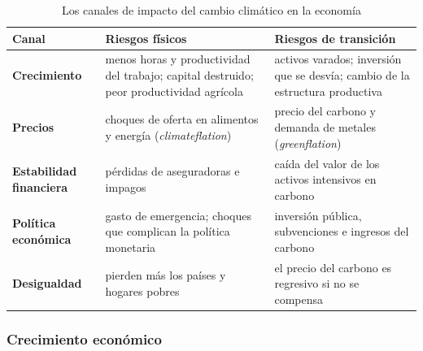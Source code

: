 \documentclass[11pt]{article}
\begin{document}
\begin{table}[H]
\centering
\caption{Los canales de impacto del cambio climático en la economía}\label{tab:canales}
\small
\begin{tabular}{>{\raggedright\arraybackslash}m{2.7cm}>{\raggedright\arraybackslash}m{5.6cm}>{\raggedright\arraybackslash}m{5.6cm}}
\toprule
\rowcolor{tceeazulpalido}\textbf{Canal} & \textbf{Riesgos físicos} & \textbf{Riesgos de transición}\\
\midrule
\textcolor{tceemorado}{\textbf{Crecimiento}} & menos horas y productividad del trabajo; capital destruido; peor productividad agrícola & activos varados; inversión que se desvía; cambio de la estructura productiva\\
\addlinespace[0.3em]
\textcolor{tceemorado}{\textbf{Precios}} & choques de oferta en alimentos y energía (\emph{climateflation}) & precio del carbono y demanda de metales (\emph{greenflation})\\
\addlinespace[0.3em]
\textcolor{tceemorado}{\textbf{Estabilidad financiera}} & pérdidas de aseguradoras e impagos & caída del valor de los activos intensivos en carbono\\
\addlinespace[0.3em]
\textcolor{tceemorado}{\textbf{Política económica}} & gasto de emergencia; choques que complican la política monetaria & inversión pública, subvenciones e ingresos del carbono\\
\addlinespace[0.3em]
\textcolor{tceemorado}{\textbf{Desigualdad}} & pierden más los países y hogares pobres & el precio del carbono es regresivo si no se compensa\\
\bottomrule
\end{tabular}
\end{table}

\subsubsection{Crecimiento económico}\label{sec:canal-crecimiento}
\end{document}
